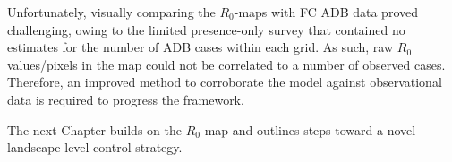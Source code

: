 Unfortunately, visually comparing the $R_0$-maps with FC ADB data proved challenging, owing to the limited presence-only survey that contained no estimates for the number of ADB cases within each grid.
As such, raw $R_0$ values/pixels in the map could not be correlated to a number of observed cases.
Therefore, an improved method to corroborate the model against observational data is required to progress the framework.

The next Chapter builds on the $R_0$-map and outlines steps toward a novel landscape-level control strategy.